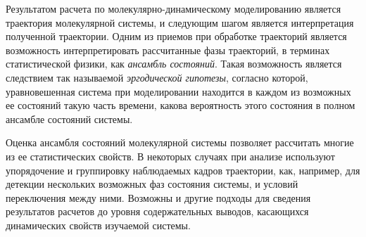 



Результатом расчета по молекулярно-динамическому моделированию является траектория молекулярной системы, и следующим шагом является интерпретация полученной траектории. Одним из приемов при обработке траекторий является возможность интерпретировать рассчитанные фазы траекторий, в терминах статистической физики, как \textit{ансамбль состояний}. Такая возможность является следствием так называемой \textit{эргодической гипотезы}, согласно которой, уравновешенная система при моделировании находится в каждом из возможных ее состояний такую часть времени, какова вероятность этого состояния в полном ансамбле состояний системы. 

Оценка ансамбля состояний молекулярной системы позволяет рассчитать многие из ее статистических свойств. В некоторых случаях при анализе используют упорядочение и группировку наблюдаемых кадров траектории, как, например, для детекции нескольких возможных фаз состояния системы, и условий переключения между ними. Возможны и другие подходы для сведения результатов расчетов до уровня содержательных выводов, касающихся динамических свойств изучаемой системы. 

